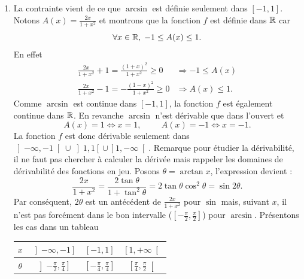 \begin{enumerate}

\item  La contrainte vient de ce que $\arcsin$ est définie seulement dans $[-1,1]$. Notons $A(x) = \frac{2x}{1+x^2}$ et montrons que la fonction $f$ est définie dans $\mathbb{R}$ car
\begin{displaymath}
 \forall x \in \mathbb{R},\; -1 \leq A(x) \leq 1.
\end{displaymath}
En effet
\begin{align*}
\frac{2x}{1+x^{2}}+1=\frac{(1+x)^{2}}{1+x^{2}}\geq 0 &\Rightarrow -1 \leq A(x)\\
\frac{2x}{1+x^{2}}-1=-\frac{(1-x)^{2}}{1+x^{2}}\geq 0 &\Rightarrow A(x) \leq 1. 
\end{align*}
Comme $\arcsin$ est continue dans $[-1,1]$, la fonction $f$ est également continue dans $\mathbb{R}$. En revanche $\arcsin$ n'est dérivable que dans l'ouvert et 
\begin{displaymath}
 A(x) = 1 \Leftrightarrow x = 1, \hspace{1cm} A(x) = -1 \Leftrightarrow x = -1.
\end{displaymath}
La fonction $f$ est donc dérivable seulement dans $\left] -\infty, -1\right[ {} \cup {}  \left] 1 , 1\left[  {} \cup  {} \right] 1 , -\infty\right[$.\newline
Remarque pour étudier la dérivabilité, il ne faut pas chercher à calculer la dérivée mais rappeler les domaines de dérivabilité des fonctions en jeu.\newline
Posons $\theta =\arctan x$, l'expression devient :
\begin{displaymath}
 \frac{2x}{1+x^{2}} = \frac{2\tan \theta }{1+\tan ^{2}\theta }
  = 2\tan \theta \cos ^{2}\theta =\sin 2\theta.
\end{displaymath}
Par cons{\'e}quent, $2\theta $ est un ant{\'e}c{\'e}dent de $\frac{2x}{1+x^{2}}$ pour $\sin $ mais, suivant $x$, il n'est pas forcément dans le bon intervalle ($\left[ -\frac{\pi}{2}, \frac{\pi}{2}\right] $) pour $\arcsin$. Présentons les cas dans un tableau
\begin{center}
\renewcommand{\arraystretch}{1.5}
\begin{tabular}{|c|c|c|c|} \hline
$x$       & $\left] -\infty, -1\right] $                  & $\left[ -1 , 1\right] $                        & $\left[ 1 , +\infty\right[ $                 \\ \hline
$\theta$  & $\left] -\frac{\pi}{2}, \frac{\pi}{4}\right]$ & $\left[ -\frac{\pi}{4}, \frac{\pi}{4}\right]$  & $\left[ \frac{\pi}{4}, \frac{\pi}{2}\right[$ \\ \hline

\end{tabular}
\end{center}
\end{enumerate}
